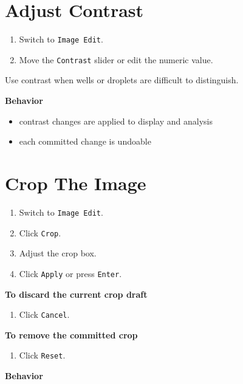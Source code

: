 \documentclass[
  9pt,
  letterpaper,
  oneside,
  open=any,
  DIV=15,
  parskip=half-,
  headings=big,
  numbers=noenddot
]{scrbook}
\newcommand{\manuallead}[1]{%
  \vspace{0.15em}%
  {\sffamily\bfseries\color{ManualBlue}#1}\par\nobreak\vspace{0.05em}%
}
\begin{document}
\section{Adjust Contrast}

\begin{enumerate}[leftmargin=*,itemsep=0.35em,topsep=0.4em]
\item Switch to \texttt{Image Edit}.
\item Move the \texttt{Contrast} slider or edit the numeric value.
\end{enumerate}

Use contrast when wells or droplets are difficult to distinguish.


\manuallead{Behavior}

\begin{itemize}[leftmargin=*,itemsep=0.35em,topsep=0.4em]
\item contrast changes are applied to display and analysis
\item each committed change is undoable
\end{itemize}

\section{Crop The Image}

\begin{enumerate}[leftmargin=*,itemsep=0.35em,topsep=0.4em]
\item Switch to \texttt{Image Edit}.
\item Click \texttt{Crop}.
\item Adjust the crop box.
\item Click \texttt{Apply} or press \texttt{Enter}.
\end{enumerate}

\manuallead{To discard the current crop draft}

\begin{enumerate}[leftmargin=*,itemsep=0.35em,topsep=0.4em]
\item Click \texttt{Cancel}.
\end{enumerate}

\manuallead{To remove the committed crop}

\begin{enumerate}[leftmargin=*,itemsep=0.35em,topsep=0.4em]
\item Click \texttt{Reset}.
\end{enumerate}

\manuallead{Behavior}
\end{document}
